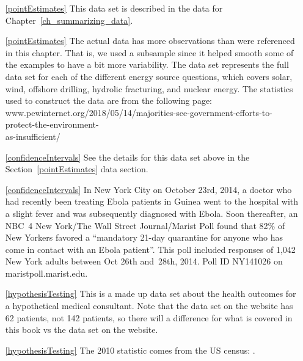 \begin{itemize}

\item[\ref{pointEstimates}]
    This data set is described in
    the data for Chapter~\ref{ch_summarizing_data}.

\item[\ref{pointEstimates}]
    The actual data has more observations than were referenced
    in this chapter.
    That is, we used a subsample since it helped smooth some
    of the examples to have a bit more variability.
    The  data set represents
    the full data set for each of the different energy source
    questions, which covers solar, wind, offshore drilling,
    hydrolic fracturing, and nuclear energy.
    The statistics used to construct the data are from
    the following page: \\
        {{\small{www.pewinternet.org/2018/05/14/majorities-see-government-efforts-to-protect-the-environment-\\as-insufficient/}}}
    
\item[\ref{confidenceIntervals}]
    See the details for this data set above
    in the Section~\ref{pointEstimates} data section.
\item[\ref{confidenceIntervals}]
    In New York City on October 23rd, 2014, a doctor who had
    recently been treating Ebola patients in Guinea went to
    the hospital with a slight fever and was subsequently
    diagnosed with Ebola.
    Soon thereafter, an NBC~4 New York/The Wall Street
    Journal/Marist Poll found that
    82\% of New Yorkers favored a
    ``mandatory 21-day quarantine for anyone who has come
    in contact with an Ebola patient''.
    This poll included responses of 1,042
    New York adults between Oct 26th and~28th, 2014.
        {Poll ID NY141026 on maristpoll.marist.edu}.

\item[\ref{hypothesisTesting}]
    This is a made up data set about the health outcomes
    for a hypothetical medical consultant.
    Note that the data set on the website has 62 patients,
    not 142 patients, so there will a difference for what
    is covered in this book vs the data set on the website.

\item[\ref{hypothesisTesting}]
    The 2010 statistic comes from the US census:
    .

\end{itemize}



